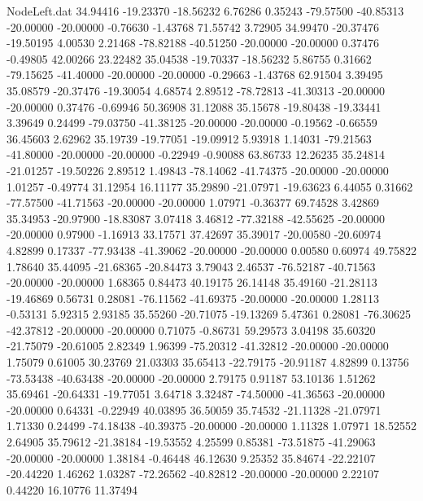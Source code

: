 \begin{filecontents}{NodeLeft.dat}
  34.94416  -19.23370  -18.56232     6.76286    0.35243  -79.57500  -40.85313  -20.00000  -20.00000   -0.76630   -1.43768   71.55742    3.72905
  34.99470  -20.37476  -19.50195     4.00530    2.21468  -78.82188  -40.51250  -20.00000  -20.00000    0.37476   -0.49805   42.00266   23.22482
  35.04538  -19.70337  -18.56232     5.86755    0.31662  -79.15625  -41.40000  -20.00000  -20.00000   -0.29663   -1.43768   62.91504    3.39495
  35.08579  -20.37476  -19.30054     4.68574    2.89512  -78.72813  -41.30313  -20.00000  -20.00000    0.37476   -0.69946   50.36908   31.12088
  35.15678  -19.80438  -19.33441     3.39649    0.24499  -79.03750  -41.38125  -20.00000  -20.00000   -0.19562   -0.66559   36.45603    2.62962
  35.19739  -19.77051  -19.09912     5.93918    1.14031  -79.21563  -41.80000  -20.00000  -20.00000   -0.22949   -0.90088   63.86733   12.26235
  35.24814  -21.01257  -19.50226     2.89512    1.49843  -78.14062  -41.74375  -20.00000  -20.00000    1.01257   -0.49774   31.12954   16.11177
  35.29890  -21.07971  -19.63623     6.44055    0.31662  -77.57500  -41.71563  -20.00000  -20.00000    1.07971   -0.36377   69.74528    3.42869
  35.34953  -20.97900  -18.83087     3.07418    3.46812  -77.32188  -42.55625  -20.00000  -20.00000    0.97900   -1.16913   33.17571   37.42697
  35.39017  -20.00580  -20.60974     4.82899    0.17337  -77.93438  -41.39062  -20.00000  -20.00000    0.00580    0.60974   49.75822    1.78640
  35.44095  -21.68365  -20.84473     3.79043    2.46537  -76.52187  -40.71563  -20.00000  -20.00000    1.68365    0.84473   40.19175   26.14148
  35.49160  -21.28113  -19.46869     0.56731    0.28081  -76.11562  -41.69375  -20.00000  -20.00000    1.28113   -0.53131    5.92315    2.93185
  35.55260  -20.71075  -19.13269     5.47361    0.28081  -76.30625  -42.37812  -20.00000  -20.00000    0.71075   -0.86731   59.29573    3.04198
  35.60320  -21.75079  -20.61005     2.82349    1.96399  -75.20312  -41.32812  -20.00000  -20.00000    1.75079    0.61005   30.23769   21.03303
  35.65413  -22.79175  -20.91187     4.82899    0.13756  -73.53438  -40.63438  -20.00000  -20.00000    2.79175    0.91187   53.10136    1.51262
  35.69461  -20.64331  -19.77051     3.64718    3.32487  -74.50000  -41.36563  -20.00000  -20.00000    0.64331   -0.22949   40.03895   36.50059
  35.74532  -21.11328  -21.07971     1.71330    0.24499  -74.18438  -40.39375  -20.00000  -20.00000    1.11328    1.07971   18.52552    2.64905
  35.79612  -21.38184  -19.53552     4.25599    0.85381  -73.51875  -41.29063  -20.00000  -20.00000    1.38184   -0.46448   46.12630    9.25352
  35.84674  -22.22107  -20.44220     1.46262    1.03287  -72.26562  -40.82812  -20.00000  -20.00000    2.22107    0.44220   16.10776   11.37494

\end{filecontents}
